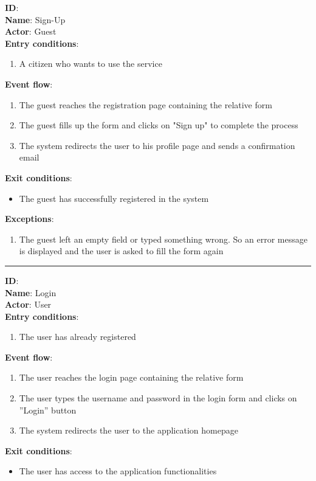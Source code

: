 	\textbf{ID}:  \\
	\textbf{Name}: Sign-Up \\
	\textbf{Actor}: Guest \\
	\textbf{Entry conditions}:
	\begin{enumerate}
		\item{A citizen who wants to use the service}
	\end{enumerate}
	\textbf{Event flow}:
	\begin{enumerate}
		\item{The guest reaches the registration page containing the relative form}
		\item{The guest ﬁlls up the form and clicks on "Sign up" to complete the process}
		\item{The system redirects the user to his proﬁle page and sends a conﬁrmation email}
	\end{enumerate}
	\textbf{Exit conditions}:
	\begin{itemize}
		\item{The guest has successfully registered in the system}
	\end{itemize}
	\textbf{Exceptions}:
	\begin{enumerate}
    		\item{The guest left an empty ﬁeld or typed something wrong. So an error message is displayed and the user is asked to ﬁll the form again}
 	   \end{enumerate}
	\rule{\linewidth}{0.4pt}
	\textbf{ID}:  \\
	\textbf{Name}: Login \\
	\textbf{Actor}: User \\
	\textbf{Entry conditions}:
	\begin{enumerate}
		\item{The user has already registered}
	\end{enumerate}
	\textbf{Event flow}:
	\begin{enumerate}
		\item{The user reaches the login page containing the relative form}
		\item{The user types the username and password in the login form and clicks on ”Login” button}
		\item{The system redirects the user to the application homepage}
	\end{enumerate}
	\textbf{Exit conditions}:
	\begin{itemize}
		\item{The user has access to the application functionalities}
	\end{itemize}
